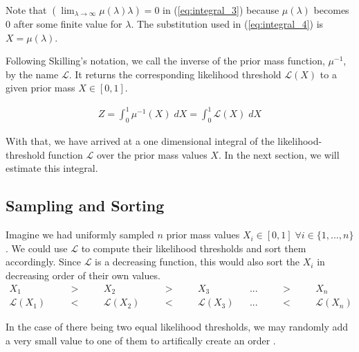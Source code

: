 \documentclass[12pt, a4paper]{report}
\begin{document}
Note that $\left(\lim_{\lambda \rightarrow \infty} \mu(\lambda) \lambda\right) = 0$ in (\ref{eq:integral_3}) because $\mu(\lambda)$ becomes $0$ after some finite value for $\lambda$. The substitution used in (\ref{eq:integral_4}) is $X = \mu(\lambda)$.

Following Skilling's notation, we call the inverse of the prior mass function, $\mu^{-1}$, by the name $\mathcal{L}$.
It returns the corresponding likelihood threshold $\mathcal{L}(X)$ to a given prior mass $X \in [0,1]$.

\begin{align}
    Z = \int_0^1 \mu^{-1}(X) \; dX = \int_0^1 \mathcal{L}(X) \; dX
    \label{eq:integral_5}
\end{align}

With that, we have arrived at a one dimensional integral of the likelihood-threshold function $\mathcal{L}$ over the prior mass values $X$. In the next section, we will estimate this integral.

\FloatBarrier
\subsection{Sampling and Sorting}

Imagine we had uniformly sampled $n$ prior mass values $X_i \in [0,1] \; \forall i \in \{1, ..., n\}$.
We could use $\mathcal{L}$ to compute their likelihood thresholds and sort them accordingly.
Since $\mathcal{L}$ is a decreasing function, this would also sort the $X_i$ in decreasing order of their own values.
\begin{align}
    X_1 & \quad &>& \quad &X_2 & \quad &>& \quad &X_3 & &...& \quad &>& \quad &X_n \nonumber\\
    \mathcal{L}(X_1)& &<& &\mathcal{L}(X_2)& &<& &\mathcal{L}(X_3)&  &...& &<& &\mathcal{L}(X_n) \label{eq:sample_ordering}
\end{align}

In the case of there being two equal likelihood thresholds, we may randomly add a very small value to one of them to artifically create an order \cite[3]{skilling}.
\end{document}
